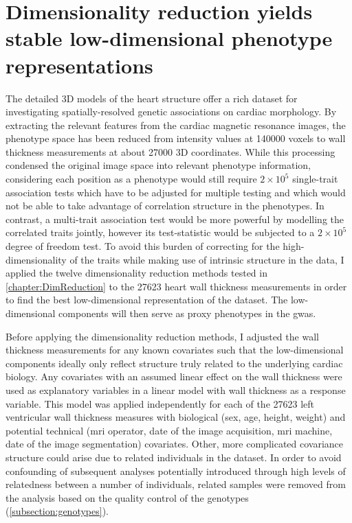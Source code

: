 \newpage
\section{Dimensionality reduction yields stable low-dimensional phenotype representations}
\label{section:DimRed-heart}
The detailed 3D models of the heart structure offer a rich dataset for investigating spatially-resolved genetic associations on cardiac morphology. By extracting the relevant features from the cardiac magnetic resonance images, the phenotype space has been reduced from intensity values at \num{140000} voxels to wall thickness measurements at about \num{27000} 3D coordinates. While this processing condensed the original image space into relevant phenotype information, considering each position as a phenotype would still require \(2\times 10^5\)  single-trait association tests which have to be adjusted for multiple testing and which would not be able to take advantage of correlation structure in the phenotypes. In contrast, a multi-trait association test would be more powerful by modelling the correlated traits jointly, however its test-statistic would be subjected to a \(2 \times 10^5\)  degree of freedom test. To avoid this burden of correcting for the high-dimensionality of the traits while making use of intrinsic structure in the data, I applied the twelve dimensionality reduction methods tested in \cref{chapter:DimReduction} to the \num{27623} heart wall thickness measurements in order to find the best low-dimensional representation of the dataset. The low-dimensional components will then serve as proxy phenotypes in the \gls{gwas}.

Before applying the dimensionality reduction methods, I adjusted the wall thickness measurements for any known covariates such that the low-dimensional components ideally only reflect structure truly related to the underlying cardiac biology. Any covariates with an assumed linear effect on the wall thickness were used as explanatory variables in a linear model with wall thickness as a response variable. This model was applied independently for each of the \num{27623} left ventricular wall thickness measures with biological (sex, age, height, weight) and potential technical (\gls{mri} operator, date of the image acquisition, \gls{mri} machine, date of the image segmentation) covariates. Other, more complicated covariance structure could arise due to related individuals in the dataset. In order to avoid confounding of subsequent analyses potentially introduced through high levels of relatedness between a number of individuals, related samples were removed from the analysis based on the quality control of the genotypes (\cref{subsection:genotypes}). 

